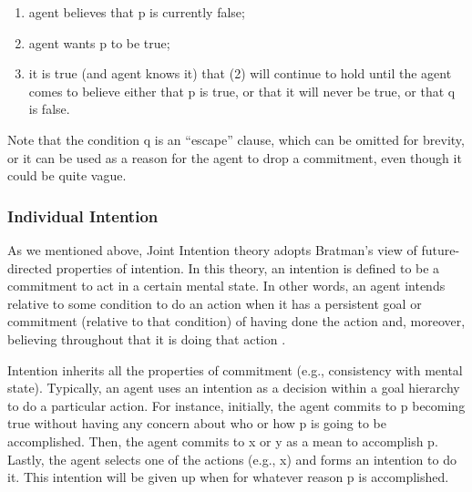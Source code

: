 \documentclass[12pt]{report}
\begin{document}
\begin{enumerate}
  \item agent believes that p is currently false;
  \item agent wants p to be true;
  \item it is true (and agent knows it) that (2) will continue to hold until the
  agent comes to believe either that p is true, or that it will never be true,
  or that q is false.
\end{enumerate}

Note that the condition q is an ``escape'' clause, which can be omitted for
brevity, or it can be used as a reason for the agent to drop a commitment, even
though it could be quite vague.

\subsubsection{Individual Intention}
\label{sec:individual-intention}

As we mentioned above, Joint Intention theory adopts Bratman's view of
future-directed properties of intention. In this theory, an intention is defined
to be a commitment to act in a certain mental state. In other words, an agent
intends relative to some condition to do an action when it has a persistent goal
or commitment (relative to that condition) of having done the action and,
moreover, believing throughout that it is doing that action
\cite{cohen:teamwork}.

Intention inherits all the properties of commitment (e.g., consistency with
mental state). Typically, an agent uses an intention as a decision within a
goal hierarchy to do a particular action. For instance, initially, the agent
commits to p becoming true without having any concern about who or how p is
going to be accomplished. Then, the agent commits to x or y as a mean to
accomplish p. Lastly, the agent selects one of the actions (e.g., x) and forms
an intention to do it. This intention will be given up when for whatever reason
p is accomplished.

% 
\end{document}
